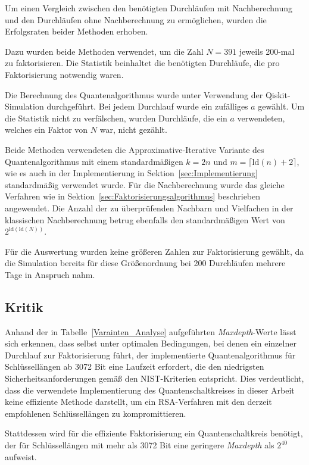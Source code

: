 Um einen Vergleich zwischen den benötigten Durchläufen mit Nachberechnung und den Durchläufen ohne Nachberechnung zu ermöglichen, 
wurden die Erfolgsraten beider Methoden erhoben.

Dazu wurden beide Methoden verwendet, um die Zahl \(N=391\) jeweils 200-mal zu faktorisieren.
Die Statistik beinhaltet die benötigten Durchläufe, die pro Faktorisierung notwendig waren.

Die Berechnung des Quantenalgorithmus wurde unter Verwendung der Qiskit-Simulation durchgeführt. 
Bei jedem Durchlauf wurde ein zufälliges \(a\) gewählt.
Um die Statistik nicht zu verfälschen, wurden Durchläufe, die ein \(a\) verwendeten, 
welches ein Faktor von \(N\) war, nicht gezählt.

Beide Methoden verwendeten die Approximative-Iterative Variante des Quantenalgorithmus mit einem standardmäßigen \(k=2n\) und \(m=\lceil\text{ld}(n)+2\rceil\),
wie es auch in der Implementierung in Sektion~\ref{sec:Implementierung} standardmäßig verwendet wurde. 
Für die Nachberechnung wurde das gleiche Verfahren wie in Sektion~\ref{sec:Faktorisierungsalgorithmus} beschrieben angewendet. 
Die Anzahl der zu überprüfenden Nachbarn und Vielfachen in der klassischen Nachberechnung betrug ebenfalls den standardmäßigen Wert von \(2^{\text{ld}(\text{ld}(N))}\).

Für die Auswertung wurden keine größeren Zahlen zur Faktorisierung gewählt, 
da die Simulation bereits für diese Größenordnung bei 200 Durchläufen mehrere Tage in Anspruch nahm.

\subsection*{Kritik}

Anhand der in Tabelle~\ref{Varainten_Analyse} aufgeführten \textit{Maxdepth}-Werte lässt sich erkennen, 
dass selbst unter optimalen Bedingungen, bei denen ein einzelner Durchlauf zur Faktorisierung führt, 
der implementierte Quantenalgorithmus für Schlüssellängen ab 3072 Bit eine Laufzeit erfordert, 
die den niedrigsten Sicherheitsanforderungen gemäß den NIST-Kriterien entspricht. 
Dies verdeutlicht, dass die verwendete Implementierung des Quantenschaltkreises in dieser Arbeit keine effiziente Methode darstellt, 
um ein RSA-Verfahren mit den derzeit empfohlenen Schlüssellängen zu kompromittieren.

Stattdessen wird für die effiziente Faktorisierung ein Quantenschaltkreis benötigt, 
der für Schlüssellängen mit mehr als 3072 Bit eine geringere \textit{Maxdepth} als \(2^{40} \) aufweist.

